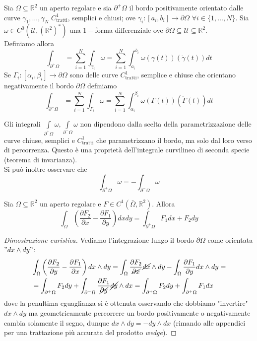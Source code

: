\begin{definition}
	Sia $\Omega \subseteq \mathbb{R}^2$ un aperto regolare e sia $\partial^{+} \Omega$ il bordo positivamente orientato dalle curve $\gamma_1, \ldots, \gamma_N$ $C^1_\text{tratti}$, semplici e chiusi; ove
	$\gamma_i: [a_i, b_i] \to \partial \Omega \, \, \forall i \in \{1, \ldots, N \}$. Sia $\omega \in C^0(\mathcal{U}, (\mathbb{R}^2)^*)$ una $1-$forma differenziale ove $\partial \Omega \subseteq \mathcal{U} \subseteq \mathbb{R}^2$. \\
	Definiamo allora
	$$
	\int_{\partial^{+} \Omega} = \sum_{i=1}^N \int_{\gamma_i} \omega = \sum_{i=1}^N \int_{a_i}^{b_i} \omega(\gamma(t))(\dot{\gamma}(t))dt
	$$
	Se $\Gamma_i: [\alpha_i, \beta_i] \to \partial \Omega$ sono delle curve $C^1_\text{tratti}$, semplice e chiuse che orientano negativamente il bordo $\partial \Omega$ definiamo
	$$
	\int_{\partial^{-} \Omega} = \sum_{i=1}^N \int_{\Gamma_i} \omega = \sum_{i=1}^N \int_{\alpha_i}^{\beta_i} \omega(\Gamma(t))(\dot{\Gamma}(t))dt
	$$
\end{definition}
\begin{remark}
	Gli integrali $\int\limits_{\partial^{+} \Omega} \omega, \int\limits_{\partial^{-} \Omega} \omega$ non dipendono dalla scelta della parametrizzazione delle curve chiuse, semplici e $C^1_\text{tratti}$ che parametrizzano il bordo, ma solo dal
	loro verso di percorrenza. Questo è una proprietà dell'integrale curvilineo di seconda specie (teorema di invarianza). \\
	Si può inoltre osservare che
	$$
	\int_{\partial^{+} \Omega} \omega = - \int_{\partial^{-} \Omega} \omega
	$$
\end{remark}
\begin{theorem}
	Sia $\Omega \subseteq \mathbb{R}^2$ un aperto regolare e $F \in C^1(\bar{\Omega}, \mathbb{R}^2)$. Allora
	$$
	\int_\Omega \left( \frac{\partial F_2}{\partial x} - \frac{\partial F_1}{\partial y} \right) dxdy = \int_{\partial^{+} \Omega} F_1dx + F_2dy
	$$
\end{theorem}
\begin{proof}[Dimostrazione euristica]
	Vediamo l'integrazione lungo il bordo $\partial \Omega$ come orientata $"dx \wedge dy"$:
	\begin{align*}
	&\int_\Omega \left(\frac{\partial F_2}{\partial y} - \frac{\partial F_1}{\partial x} \right) dx \wedge dy = \int_\Omega \frac{\partial F_2}{\cancel{\partial x}} \cancel{dx} \wedge dy - \int_{\Omega} \frac{\partial F_1}{\partial y} dx \wedge dy = \\
	&=\int_{\partial^{+} \Omega} F_2 dy + \int_{\partial^{-} \Omega} \frac{\partial F_1}{\cancel{\partial y}} \cancel{dy} \wedge dx = \int_{\partial^{+} \Omega} F_2 dy + \int_{\partial^{+} \Omega} F_1 dx
	\end{align*}
	dove la penultima eguaglianza si è ottenuta osservando che dobbiamo "invertire" $dx \wedge dy$ ma geometricamente percorrere un bordo positivamente o negativamente cambia solamente il segno, dunque $dx \wedge dy = - dy \wedge dx$ (rimando alle appendici per una trattazione più accurata del prodotto \emph{wedge}).
\end{proof}
